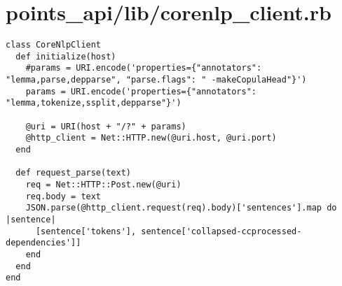 \documentclass{article}
\begin{document}
\section*{points\_api/lib/corenlp\_client.rb}
\begin{verbatim}
class CoreNlpClient
  def initialize(host)
    #params = URI.encode('properties={"annotators": "lemma,parse,depparse", "parse.flags": " -makeCopulaHead"}')
    params = URI.encode('properties={"annotators": "lemma,tokenize,ssplit,depparse"}')

    @uri = URI(host + "/?" + params)
    @http_client = Net::HTTP.new(@uri.host, @uri.port)
  end

  def request_parse(text)
    req = Net::HTTP::Post.new(@uri)
    req.body = text
    JSON.parse(@http_client.request(req).body)['sentences'].map do |sentence|
      [sentence['tokens'], sentence['collapsed-ccprocessed-dependencies']]
    end
  end
end


\end{verbatim}
\pagebreak
\end{document}
